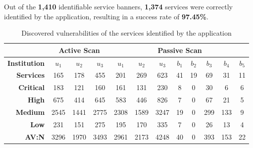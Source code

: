 \documentclass[a4paper,12pt]{article}
\begin{document}
	Out of the \textbf{1,410} identifiable service banners, \textbf{1,374} services were correctly identified by the application, resulting in a success rate of \textbf{97.45\%}.
	
	\begin{table}[H]
		\centering
		\begin{tabular}{r|ccc|ccc|ccccc|}
			\cline{2-12}
			\multicolumn{1}{l|}{}                         & \multicolumn{3}{c|}{\textbf{Active Scan}} & \multicolumn{8}{c|}{\textbf{Passive Scan}}                                                             \\ \hline
			\multicolumn{1}{|r|}{\textbf{Institution}}      & \textbf{$u_1$}    & \textbf{$u_2$}    & \textbf{$u_3$}   & \textbf{$u_1$} & \textbf{$u_2$} & \textbf{$u_3$} & \textbf{$b_1$} & \textbf{$b_2$} & \textbf{$b_3$} & \textbf{$b_4$} & \textbf{$b_5$} \\
			\multicolumn{1}{|r|}{\textbf{Services}} & 165            & 178            & 455           & 201         & 269         & 623         & 41          & 19          & 69          & 31          & 11          \\ \hline
			\multicolumn{1}{|r|}{\textbf{Critical}}       & 183            & 121            & 160           & 161         & 131         & 230         & 8           & 0           & 30          & 6           & 6           \\
			\multicolumn{1}{|r|}{\textbf{High}}          & 675            & 414            & 645           & 583         & 446         & 826         & 7           & 0           & 67          & 21          & 5           \\
			\multicolumn{1}{|r|}{\textbf{Medium}}        & 2545           & 1441           & 2775          & 2308        & 1589        & 3247        & 19          & 0           & 299         & 133         & 9           \\
			\multicolumn{1}{|r|}{\textbf{Low}}       & 231            & 151            & 275           & 195         & 170         & 335         & 7           & 0           & 26          & 13          & 4           \\
			\multicolumn{1}{|r|}{\textbf{AV:N}}           & 3296           & 1970           & 3493          & 2961        & 2173        & 4248        & 40          & 0           & 393         & 153         & 22          \\ \hline
		\end{tabular}
		\caption{Discovered vulnerabilities of the services identified by the application}
		\label{cpevulns}
	\end{table}
	
\end{document}
